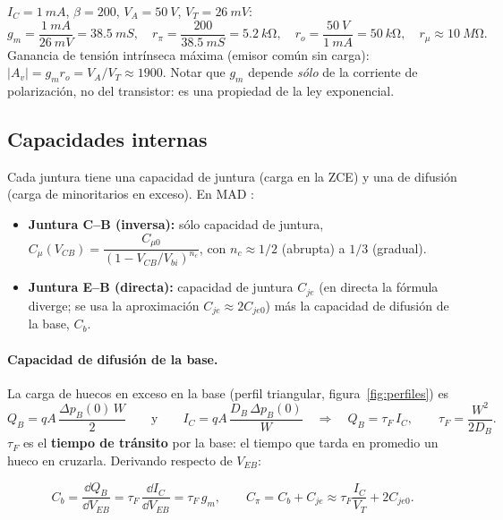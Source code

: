\begin{ejemplo}
$I_C=\SI{1}{mA}$, $\beta=200$, $V_A=\SI{50}{V}$, $V_T=\SI{26}{mV}$:
\[
  g_m=\frac{\SI{1}{mA}}{\SI{26}{mV}}=\SI{38.5}{mS},\quad
  r_\pi=\frac{200}{\SI{38.5}{mS}}=\SI{5.2}{k\ohm},\quad
  r_o=\frac{\SI{50}{V}}{\SI{1}{mA}}=\SI{50}{k\ohm},\quad
  r_\mu\approx\SI{10}{M\ohm}.
\]
Ganancia de tensión intrínseca máxima (emisor común sin carga):
$|A_v|=g_mr_o=V_A/V_T\approx1900$. Notar que $g_m$ depende \emph{sólo} de la corriente de
polarización, no del transistor: es una propiedad de la ley exponencial.
\end{ejemplo}

\subsection{Capacidades internas}

Cada juntura tiene una capacidad de juntura (carga en la ZCE) y una de difusión (carga de
minoritarios en exceso). En MAD :
\begin{itemize}
  \item \textbf{Juntura C--B (inversa):} sólo capacidad de juntura,
  $C_\mu(V_{CB}) = \dfrac{C_{\mu0}}{\left(1-V_{CB}/V_{bi}\right)^{n_c}}$, con $n_c\approx1/2$
  (abrupta) a $1/3$ (gradual).
  \item \textbf{Juntura E--B (directa):} capacidad de juntura $C_{je}$ (en directa la fórmula
  diverge; se usa la aproximación $C_{je}\approx2C_{je0}$) más la capacidad de difusión de la
  base, $C_b$.
\end{itemize}

\paragraph{Capacidad de difusión de la base.} La carga de huecos en exceso en la base (perfil
triangular, figura~\ref{fig:perfiles}) es
\[
  Q_B = qA\,\frac{\Delta p_B(0)\,W}{2}
  \qquad\text{y}\qquad
  I_C = qA\,\frac{D_B\,\Delta p_B(0)}{W}
  \quad\Longrightarrow\quad
  Q_B = \tau_F\,I_C,\qquad \tau_F = \frac{W^2}{2D_B}.
\]
$\tau_F$ es el \textbf{tiempo de tránsito} por la base: el tiempo que tarda en promedio un
hueco en cruzarla. Derivando respecto de $V_{EB}$:
\begin{clave}
\[
  C_b = \frac{\dd Q_B}{\dd V_{EB}} = \tau_F\,\frac{\dd I_C}{\dd V_{EB}} = \tau_F\,g_m,
  \qquad
  C_\pi = C_b + C_{je} \approx \tau_F\frac{I_C}{V_T} + 2C_{je0}.
\]
\end{clave}

